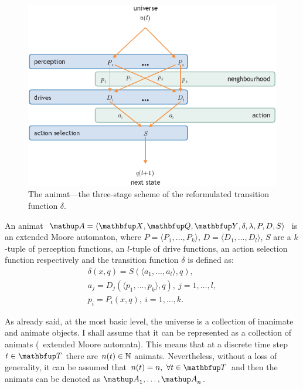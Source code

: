 \begin{figure}%
\includegraphics{fig[animat]}
\caption{The animat---the three-stage scheme of the reformulated transition function $\delta$.}
\label{fig:animat}
\end{figure}

\begin{definition}
\label{def:animat}
An animat $\autom{A}=\langle\set{X},\set{Q},\set{Y},\delta,\lambda,P,D,S\rangle$ is an extended Moore automaton, where $P=\langle P_1,\ldots,P_k\rangle$, $D=\langle D_1,\ldots,D_l\rangle$, $S$ are a $k$-tuple of perception functions, an $l$-tuple of drive functions, an action selection function respectively and the transition function $\delta$ is defined as:
\begin{eqnarray}
  & \delta(x,q) = S(\langle a_1,...,a_l\rangle,q), & \label{eq:animat:delta}\\
  & a_j = D_j(\langle p_1,...,p_k\rangle,q),\ j=1,\ldots,l, & \\
  & p_i = P_i(x,q),\ i=1,\ldots,k. & \label{eq:animat:Pi}
\end{eqnarray}
\end{definition}

As already said, at the most basic level, the universe is a collection of inanimate and animate objects. I shall assume that it can be represented as a collection of animats (\ie\ extended Moore automata). This means that at a discrete time step $t \in \set{T}$ there are $n(t) \in \mathbb{N}$ animats. Nevertheless, without a loss of generality, it can be assumed that $n(t)=n,\ \forall t \in \set{T}$ and then the animats can be denoted as $\autom{A}_1,\ldots,\autom{A}_n$. 

